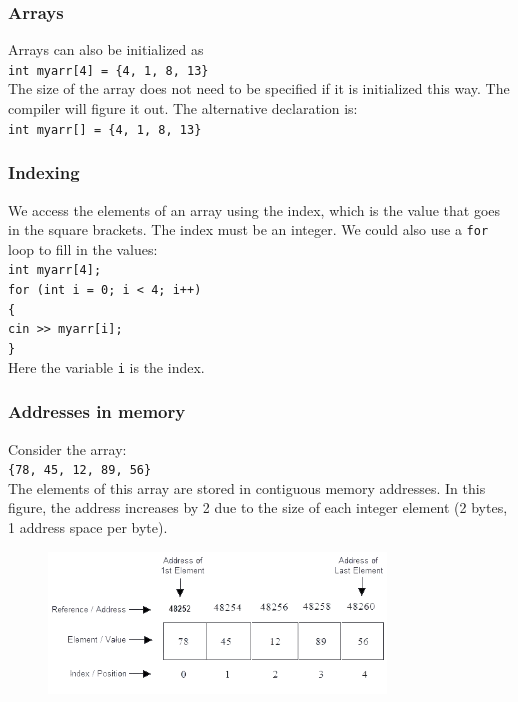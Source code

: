 \documentclass{if-beamer}
\begin{document}
\begin{frame}
\frametitle{Arrays}
Arrays can also be initialized as \\
\vspace{5pt}
\texttt{int myarr[4] = \{4, 1, 8, 13\}} \\
\vspace{5pt}
The size of the array does not need to be specified if it is
initialized this way. The compiler will figure it out. The alternative
declaration is: \\
\vspace{5pt}
\texttt{int myarr[] = \{4, 1, 8, 13\}}
\end{frame}


\begin{frame}
\frametitle{Indexing}
We access the elements of an array using the index, which is the value
that goes in the square brackets. The index must be an integer. We
could also use a \texttt{for} loop to fill in the values: \\[0.5cm]
\vspace{5pt}
\texttt{int myarr[4];}\\
\texttt{for (int i = 0; i < 4; i++)}\\
\texttt{\{}\\
\qquad \texttt{cin >> myarr[i];}\\
\texttt{\}}\\
\vspace{10pt}
Here the variable \texttt{i} is the index.
\end{frame}

\begin{frame}
\frametitle{Addresses in memory}
Consider the array: \\
\vspace{5pt}
\texttt{\{78, 45, 12, 89, 56\}} \\
\vspace{5pt}
The elements of this array are stored in contiguous memory addresses.  In
this figure, the address increases by 2 due to the size of each integer
element (2 bytes, 1 address space per byte).
\begin{figure}
\center
\includegraphics[width=0.8\textwidth]{figures/array.png}
\end{figure}
\end{frame}
\end{document}
